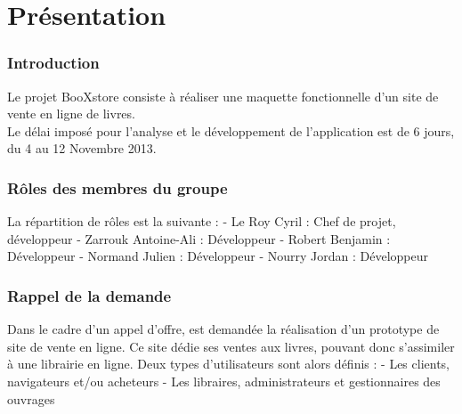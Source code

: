 \part{Présentation}
\section{Introduction}
Le projet BooXstore consiste à réaliser une maquette fonctionnelle d'un site de vente en ligne de livres.\\
Le délai imposé pour l'analyse et le développement de l'application est de 6 jours, du 4 au 12 Novembre 2013.
\section{Rôles des membres du groupe}
La répartition de rôles est la suivante :
- Le Roy Cyril : Chef de projet, développeur
- Zarrouk Antoine-Ali : Développeur
- Robert Benjamin : Développeur
- Normand Julien : Développeur
- Nourry Jordan : Développeur
\section{Rappel de la demande}
Dans le cadre d'un appel d'offre, est demandée la réalisation d'un prototype de site de vente en ligne.
Ce site dédie ses ventes aux livres, pouvant donc s'assimiler à une librairie en ligne.
Deux types d'utilisateurs sont alors définis :
- Les clients, navigateurs et/ou acheteurs
- Les libraires, administrateurs et gestionnaires des ouvrages